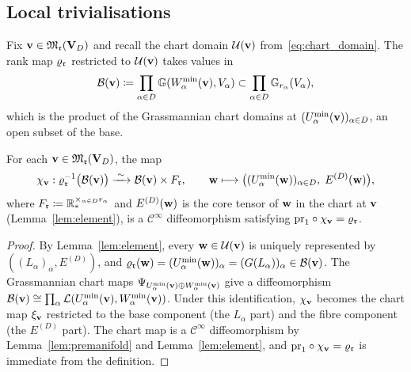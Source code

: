\subsection*{Local trivialisations}

Fix $\mathbf{v} \in \mathfrak{M}_{\mathfrak{r}}(\mathbf{V}_D)$ and recall the chart domain
$\mathcal{U}(\mathbf{v})$ from~\eqref{eq:chart_domain}. The rank map
$\varrho_{\mathfrak{r}}$ restricted to $\mathcal{U}(\mathbf{v})$ takes values in
\begin{equation*}
    \mathcal{B}(\mathbf{v})
    \coloneqq \prod_{\alpha \in D}
    \mathbb{G}(W^{\min}_{\alpha}(\mathbf{v}), V_\alpha)
    \subset \prod_{\alpha \in D} \mathbb{G}_{r_\alpha}(V_\alpha),
\end{equation*}
which is the product of the Grassmannian chart domains at
$(U^{\min}_{\alpha}(\mathbf{v}))_{\alpha \in D}$, an open subset of the base.

\begin{proposition}
\label{prop:tucker_triv}
For each $\mathbf{v} \in \mathfrak{M}_{\mathfrak{r}}(\mathbf{V}_D)$, the map
\begin{equation}
\label{eq:tucker_triv}
    \chi_{\mathbf{v}} :
    \varrho_{\mathfrak{r}}^{-1}\bigl(\mathcal{B}(\mathbf{v})\bigr)
    \xrightarrow{\;\sim\;}
    \mathcal{B}(\mathbf{v}) \times F_{\mathfrak{r}},
    \qquad
    \mathbf{w} \longmapsto
    \bigl((U^{\min}_{\alpha}(\mathbf{w}))_{\alpha \in D},\;
    E^{(D)}(\mathbf{w})\bigr),
\end{equation}
where $F_{\mathfrak{r}} \coloneqq \mathbb{R}^{\times_{\alpha \in D} r_\alpha}_*$
and $E^{(D)}(\mathbf{w})$ is the core tensor of $\mathbf{w}$ in the chart at $\mathbf{v}$
\textup{(}Lemma~\ref{lem:element}\textup{)}, is a $\mathcal{C}^\infty$
diffeomorphism satisfying $\mathrm{pr}_1 \circ \chi_{\mathbf{v}} = \varrho_{\mathfrak{r}}$.
\end{proposition}

\begin{proof}
By Lemma~\ref{lem:element}, every $\mathbf{w} \in \mathcal{U}(\mathbf{v})$ is uniquely
represented by $((L_\alpha)_\alpha, E^{(D)})$, and
$\varrho_{\mathfrak{r}}(\mathbf{w}) = (U^{\min}_{\alpha}(\mathbf{w}))_\alpha =
(G(L_\alpha))_\alpha \in \mathcal{B}(\mathbf{v})$.
The Grassmannian chart maps $\Psi_{U^{\min}_{\alpha}(\mathbf{v}) \oplus W^{\min}_{\alpha}(\mathbf{v})}$
give a diffeomorphism $\mathcal{B}(\mathbf{v}) \cong \prod_\alpha
\mathcal{L}(U^{\min}_{\alpha}(\mathbf{v}), W^{\min}_{\alpha}(\mathbf{v}))$. Under this identification,
$\chi_{\mathbf{v}}$ becomes the chart map $\xi_{\mathbf{v}}$ restricted to the
base component (the $L_\alpha$ part) and the fibre component
(the $E^{(D)}$ part). The chart map is a $\mathcal{C}^\infty$
diffeomorphism by Lemma~\ref{lem:premanifold} and
Lemma~\ref{lem:element}, and $\mathrm{pr}_1 \circ \chi_{\mathbf{v}} =
\varrho_{\mathfrak{r}}$ is immediate from the definition.
\end{proof}


